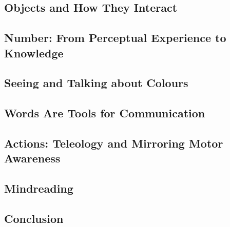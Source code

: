 \documentclass[12pt,\papersize]{extarticle}
\begin{document}
\subsection{Objects and How They Interact}

\subsection{Number: From Perceptual Experience to Knowledge}

\subsection{Seeing and Talking about Colours}

\subsection{Words Are Tools for Communication}

\subsection{Actions: Teleology and Mirroring Motor Awareness}

\subsection{Mindreading}

\subsection{Conclusion}



\end{document}
